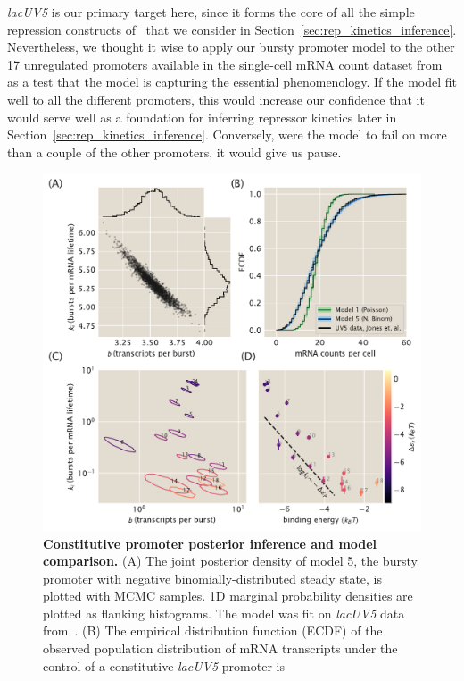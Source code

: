 \textit{lacUV5} is our primary target here, since it forms the core of all the
simple repression constructs of~\cite{Jones2014} that we consider in
Section~\ref{sec:rep_kinetics_inference}. Nevertheless, we thought it wise to
apply our bursty promoter model to the other 17 unregulated promoters available
in the single-cell mRNA count dataset from~\cite{Jones2014} as a test that the
model is capturing the essential phenomenology. If the model fit well to all the
different promoters, this would increase our confidence that it would serve well
as a foundation for inferring repressor kinetics later in
Section~\ref{sec:rep_kinetics_inference}. Conversely, were the model to fail on
more than a couple of the other promoters, it would give us pause.

\begin{figure}%
\centering
\includegraphics[width=\textwidth]{../figures/main/fig03.pdf}
\caption{\textbf{Constitutive promoter posterior inference and model
comparison.} (A) The joint posterior density of model 5, the bursty promoter
with negative binomially-distributed steady state, is plotted with MCMC samples.
1D marginal probability densities are plotted as flanking histograms. The model
was fit on \textit{lacUV5} data from~\cite{Jones2014}. (B) The empirical
distribution function (ECDF) of the observed population distribution of mRNA
transcripts under the control of a constitutive \textit{lacUV5} promoter is
}
\end{figure}
